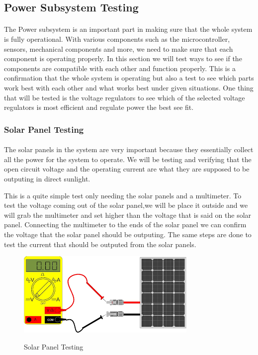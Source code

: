 \subsection{Power Subsystem Testing}
\label{sec:power_subsystem_testing}
\paragraph{}The Power subsystem is an important part in making sure that the whole system is fully operational. With various components such as the microcontroller, sensors, mechanical components and more, we need to make sure that each component is operating properly. In this section we will test ways to see if the components are compatible with each other and function properly. This is a confirmation that the whole system is operating but also a test to see which parts work best with each other and what works best under given situations. One thing that will be tested is the voltage regulators to see which of the selected voltage regulators is most efficient and regulate power the best see fit.	\par
\subsubsection{Solar Panel Testing}
\paragraph{}The solar panels in the system are very important because they essentially collect all the power for the system to operate. We will be testing and verifying that the open circuit voltage and the operating current are what they are supposed to be outputing in direct sunlight. \par
This is a quite simple test only needing the solar panels and a multimeter. To test the voltage coming out of the solar panel,we will be place it outside and we will grab the multimeter and set higher than the voltage that is said on the solar panel. Connecting the multimeter to the ends of the solar panel we can confirm the voltage that the solar panel should be outputing. The same steps are done to test the current that should be outputed from the solar panels.\par
\begin{figure}[H]
    \centering
    \caption{Solar Panel Testing}
    \includegraphics[width=\textwidth]{images/Solar_Panel_testing.png}
    \label{fig:Solar_Panel_testing}
\end{figure}

